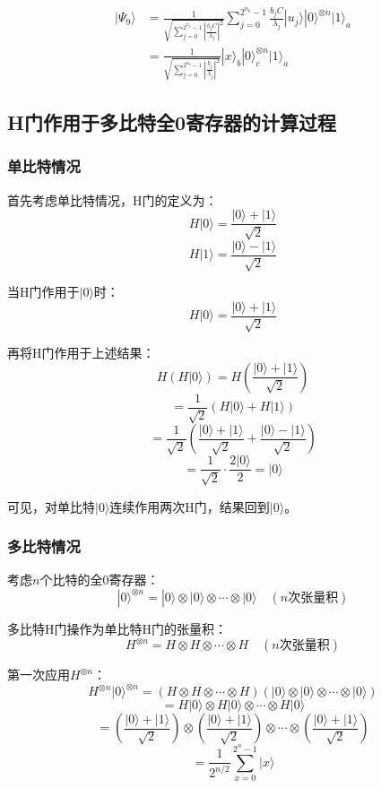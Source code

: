 \documentclass{article}
\begin{document}
\[
\begin{aligned}
|\Psi_9\rangle &= \frac{1}{\sqrt{\sum_{j=0}^{2^{n_b}-1} \left| \frac{b_j C}{\lambda_j} \right|^2}} \sum_{j=0}^{2^{n_b}-1} \frac{b_j C}{\lambda_j} |u_j\rangle |0\rangle^{\otimes n} |1\rangle_a \\
&= \frac{1}{\sqrt{\sum_{j=0}^{2^{n_b}-1} \left| \frac{b_j}{\lambda_j} \right|^2}} |x\rangle_b |0\rangle_c^{\otimes n} |1\rangle_a
\end{aligned}
\]



\subsection{H门作用于多比特全0寄存器的计算过程}

\subsubsection{单比特情况}

首先考虑单比特情况，H门的定义为：
\[
H|0\rangle = \frac{|0\rangle + |1\rangle}{\sqrt{2}}
\]
\[
H|1\rangle = \frac{|0\rangle - |1\rangle}{\sqrt{2}}
\]

当H门作用于$|0\rangle$时：
\[
H|0\rangle = \frac{|0\rangle + |1\rangle}{\sqrt{2}}
\]

再将H门作用于上述结果：
\[
H\left(H|0\rangle\right) = H\left(\frac{|0\rangle + |1\rangle}{\sqrt{2}}\right)
\]
\[
= \frac{1}{\sqrt{2}}\left(H|0\rangle + H|1\rangle\right)
\]
\[
= \frac{1}{\sqrt{2}}\left(\frac{|0\rangle + |1\rangle}{\sqrt{2}} + \frac{|0\rangle - |1\rangle}{\sqrt{2}}\right)
\]
\[
= \frac{1}{\sqrt{2}} \cdot \frac{2|0\rangle}{2} = |0\rangle
\]

可见，对单比特$|0\rangle$连续作用两次H门，结果回到$|0\rangle$。

\subsubsection{多比特情况}

考虑$n$个比特的全0寄存器：
\[
|0\rangle^{\otimes n} = |0\rangle \otimes |0\rangle \otimes \cdots \otimes |0\rangle \quad (n \text{次张量积})
\]

多比特H门操作为单比特H门的张量积：
\[
H^{\otimes n} = H \otimes H \otimes \cdots \otimes H \quad (n \text{次张量积})
\]

第一次应用$H^{\otimes n}$：
\[
H^{\otimes n}|0\rangle^{\otimes n} = (H \otimes H \otimes \cdots \otimes H)(|0\rangle \otimes |0\rangle \otimes \cdots \otimes |0\rangle)
\]
\[
= H|0\rangle \otimes H|0\rangle \otimes \cdots \otimes H|0\rangle
\]
\[
= \left(\frac{|0\rangle + |1\rangle}{\sqrt{2}}\right) \otimes \left(\frac{|0\rangle + |1\rangle}{\sqrt{2}}\right) \otimes \cdots \otimes \left(\frac{|0\rangle + |1\rangle}{\sqrt{2}}\right)
\]
\[
= \frac{1}{2^{n/2}} \sum_{x=0}^{2^{n}-1} |x\rangle
\]
\end{document}
